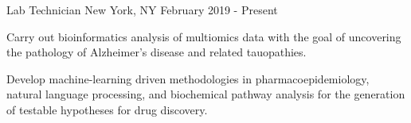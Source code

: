 %
%
%

\vspace*{0.35cm}

\begin{cventries}

    {Lab Technician}
    {New York, NY}
    {February 2019 - Present}
    {\begin{cvitems}
        \item{Carry out 
            {bioinformatics analysis} of multiomics data with the goal of uncovering the
            pathology of Alzheimer's disease and related tauopathies.\vspace*{0.1cm}}
        \item{Develop machine-learning driven methodologies in pharmacoepidemiology,
            natural language processing, and biochemical pathway analysis for the
            generation of testable hypotheses for drug discovery.}
    \end{cvitems}}
    \vspace*{0.2cm}


\end{cventries}
